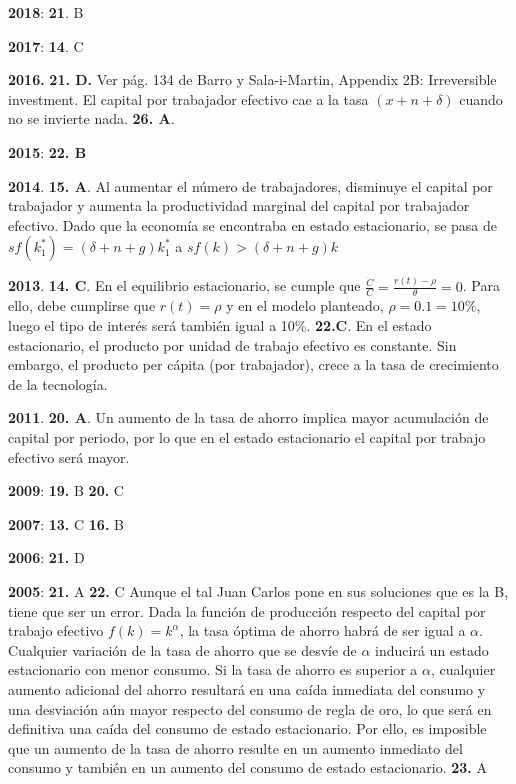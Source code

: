 \documentclass{nuevotema}
\begin{document}
\notas

\textbf{2018}: \textbf{21}. B 

\textbf{2017}: \textbf{14}. C

\textbf{2016.} \textbf{21. D.} Ver pág. 134 de Barro y Sala-i-Martin, Appendix 2B: Irreversible investment. El capital por trabajador efectivo cae a la tasa $(x+n+\delta)$ cuando no se invierte nada.  \textbf{26. A}.

\textbf{2015}: \textbf{22. B}

\textbf{2014}. \textbf{15. A}. Al aumentar el número de trabajadores, disminuye el capital por trabajador y aumenta la productividad marginal del capital por trabajador efectivo. Dado que la economía se encontraba en estado estacionario, se pasa de $sf(k^*_1) = (\delta +n +g)k^*_1$ a $sf(k) > (\delta +n +g)k$

\textbf{2013}. \textbf{14. C}. En el equilibrio estacionario, se cumple que $\frac{\dot{C}}{C} = \frac{r(t)-\rho}{\theta} = 0$. Para ello, debe cumplirse que $r(t) = \rho$ y en el modelo planteado, $\rho = 0.1 = 10\%$, luego el tipo de interés será también igual a 10\%. \textbf{22.C}. En el estado estacionario, el producto por unidad de trabajo efectivo es constante. Sin embargo, el producto per cápita (por trabajador), crece a la tasa de crecimiento de la tecnología.

\textbf{2011}. \textbf{20. A}. Un aumento de la tasa de ahorro implica mayor acumulación de capital por periodo, por lo que en el estado estacionario el capital por trabajo efectivo será mayor.

\textbf{2009}: \textbf{19.} B \textbf{20.} C

\textbf{2007}: \textbf{13.} C \textbf{16.} B

\textbf{2006}: \textbf{21.} D

\textbf{2005}: \textbf{21.} A \textbf{22.} C Aunque el tal Juan Carlos pone en sus soluciones que es la B, tiene que ser un error. Dada la función de producción respecto del capital por trabajo efectivo $f(k) = k^\alpha$, la tasa óptima de ahorro habrá de ser igual a $\alpha$. Cualquier variación de la tasa de ahorro que se desvíe de $\alpha$ inducirá un estado estacionario con menor consumo. Si la tasa de ahorro es superior a $\alpha$, cualquier aumento adicional del ahorro resultará en una caída inmediata del consumo y una desviación aún mayor respecto del consumo de regla de oro, lo que será en definitiva una caída del consumo de estado estacionario. Por ello, es imposible que un aumento de la tasa de ahorro resulte en un aumento inmediato del consumo y también en un aumento del consumo de estado estacionario. \textbf{23.} A
\end{document}
